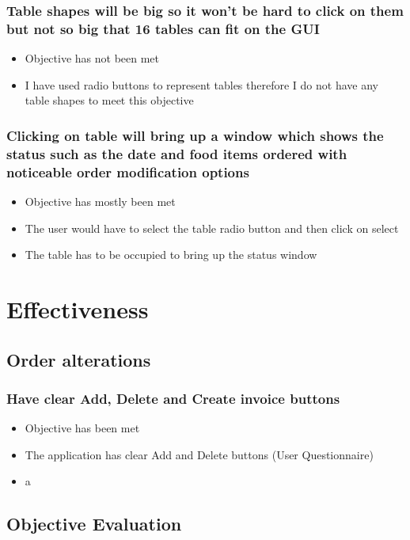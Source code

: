 \subsubsection{Table shapes will be big so it won't be hard to click on them but not so big that 16 tables can fit on the GUI}
\begin{itemize}
	\item Objective has not been met
	\item I have used radio buttons to represent tables therefore I do not have any table shapes to meet this objective

\end{itemize}

\subsubsection{Clicking on table will bring up a window which shows the status such as the date and food items ordered with noticeable order modification options}
\begin{itemize} 
	\item Objective has mostly been met
	\item The user would have to select the table radio button and then click on select
	\item The table has to be occupied to bring up the status window
\end{itemize}
\section{Effectiveness}

\subsection{Order alterations}
\subsubsection{Have clear Add, Delete and Create invoice buttons}
\begin{itemize}
	\item Objective has been met
	\item The application has clear Add and Delete buttons (User Questionnaire)
	\item  a
\end{itemize}


\subsection{Objective Evaluation}

